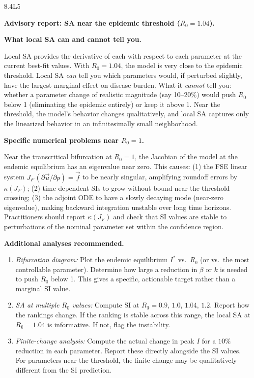 \begin{solution}{8.4}{L5}

\solanswer

\textbf{Advisory report: SA near the epidemic threshold ($R_0 = 1.04$).}

 \textbf{What local SA can and cannot tell you.}

Local SA provides the derivative of each \QOI with respect to each parameter
at the current best-fit values. With $R_0 = 1.04$, the model is very
close to the epidemic threshold. Local SA \emph{can} tell you which
parameters would, if perturbed slightly, have the largest marginal effect
on disease burden. What it \emph{cannot} tell you: whether a parameter
change of realistic magnitude (say 10--20\%) would push $R_0$ below 1
(eliminating the epidemic entirely) or keep it above 1. Near the threshold,
the model's behavior changes qualitatively, and local SA captures only the
linearized behavior in an infinitesimally small neighborhood.

 \textbf{Specific numerical problems near $R_0 = 1$.}

Near the transcritical bifurcation at $R_0 = 1$, the Jacobian of the
model at the endemic equilibrium has an eigenvalue near zero. This causes:
(1) the FSE linear system $J_F\,(\partial\vec{u}/\partial p) = \vec{f}$
to be nearly singular, amplifying roundoff errors by $\kappa(J_F)$;
(2) time-dependent SIs to grow without bound near the threshold crossing;
(3) the adjoint ODE to have a slowly decaying mode (near-zero eigenvalue),
making backward integration unstable over long time horizons.
Practitioners should report $\kappa(J_F)$ and check that SI values are
stable to perturbations of the nominal parameter set within the confidence region.

 \textbf{Additional analyses recommended.}

\begin{enumerate}[nosep]
\item \textit{Bifurcation diagram:} Plot the endemic equilibrium $I^*$ vs.\
  $R_0$ (or vs.\ the most controllable parameter). Determine how large a
  reduction in $\beta$ or $k$ is needed to push $R_0$ below 1.
  This gives a specific, actionable target rather than a marginal SI value.
\item \textit{SA at multiple $R_0$ values:} Compute SI at $R_0 = 0.9$,
  $1.0$, $1.04$, $1.2$. Report how the rankings change. If the ranking
  is stable across this range, the local SA at $R_0 = 1.04$ is informative.
  If not, flag the instability.
\item \textit{Finite-change analysis:} Compute the actual change in peak $I$
  for a $10\%$ reduction in each parameter. Report these directly alongside
  the SI values. For parameters near the threshold, the finite change may
  be qualitatively different from the SI prediction.
\end{enumerate}


\end{solution}
